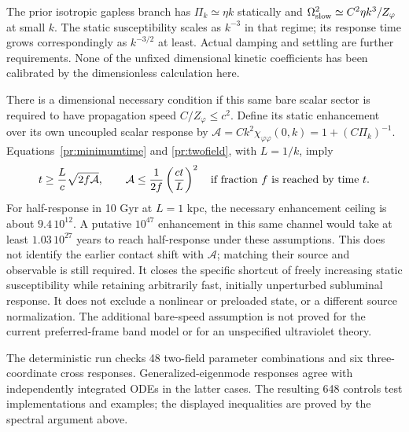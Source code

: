 \documentclass[11pt]{article}
\begin{document}
The prior isotropic gapless branch has $\Pi_k\simeq\eta k$ statically
and $\Omega_{\rm slow}^2\simeq C^2\eta k^3/Z_\varphi$ at small $k$.
The static susceptibility scales as $k^{-3}$ in that regime; its response
time grows correspondingly as $k^{-3/2}$ at least. Actual damping and
settling are further requirements. None of the unfixed dimensional kinetic
coefficients has been calibrated by the dimensionless calculation here.

There is a dimensional necessary condition if this same bare scalar sector
is required to have propagation speed $C/Z_\varphi\leq c^2$. Define its
static enhancement over its own uncoupled scalar response by
$\mathcal A=Ck^2\chi_{\varphi\varphi}(0,k)
=1+(C\Pi_k)^{-1}$. Equations~\eqref{pr:minimumtime} and
\eqref{pr:twofield}, with $L=1/k$, imply
\begin{equation}
 t\geq {L\over c}\sqrt{2f\mathcal A},\qquad
 \mathcal A\leq {1\over2f}\left({ct\over L}\right)^2
 \quad\hbox{if fraction $f$ is reached by time $t$}.
 \label{pr:causalbound}
\end{equation}
For half-response in 10 Gyr at $L=1$ kpc, the necessary enhancement ceiling
is about $9.4\,10^{12}$. A putative $10^{47}$ enhancement in this same
channel would take at least $1.03\,10^{27}$ years to reach half-response
under these assumptions. This does not identify the earlier contact shift
with $\mathcal A$; matching their source and observable is still required.
It closes the specific shortcut of freely increasing static susceptibility
while retaining arbitrarily fast, initially unperturbed subluminal response.
It does not exclude a nonlinear or preloaded state, or a different source
normalization. The additional bare-speed assumption is not proved for the
current preferred-frame band model or for an unspecified ultraviolet theory.

The deterministic run checks 48 two-field parameter combinations and six
three-coordinate cross responses. Generalized-eigenmode responses agree
with independently integrated ODEs in the latter cases. The resulting 648
controls test implementations and examples; the displayed inequalities are
proved by the spectral argument above.
\end{document}
